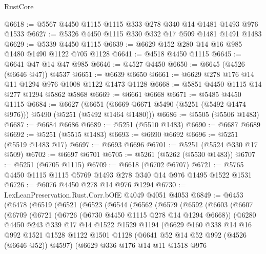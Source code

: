 \begin{lexlean}{RustCore}
\begin{coremodule}
@6618 := @5567 @4450 @1115 @1115 @333 @278 @340 @14 @1481 @1493 @976 @1533
@6627 := @5326 @4450 @1115 @330 @332 @17 @509 @1481 @1491 @1483
@6629 := @5339 @4450 @1115
@6639 := @6629 @152 @280 @14 @16 @985 @1480 @1490 @1122 @705 @1128
@6641 := @4518 @4450 @1115
@6645 := @6641 @47 @14 @47 @985
@6646 := @4527 @4450
@6650 := @6645 (@4526 (@6646 @47)) @4537
@6651 := @6639 @6650
@6661 := @6629 @278 @176 @14 @11 @1294 @976 @1008 @1122 @1473 @1128
@6668 := @5851 @4450 @1115 @14 @277 @1294 @5862 @5868
@6669 := @6661 @6668
@6671 := @5485 @4450 @1115
@6684 := @6627
    (@6651 (@6669 @6671 @5490 (@5251 (@5492 @1474 @976))) @5490 (@5251 (@5492 @1464 @1480)))
@6686 := @5505 (@5506 @1483)
@6687 := @6684 @6686
@6689 := @5251 (@5510 @1483)
@6690 := @6687 @6689
@6692 := @5251 (@5515 @1483)
@6693 := @6690 @6692
@6696 := @5251 (@5519 @1483 @17)
@6697 := @6693 @6696
@6701 := @5251 (@5524 @330 @17 @509)
@6702 := @6697 @6701
@6705 := @5261 (@5262 (@5530 @1483))
@6707 := @5251 (@6705 @1115)
@6709 := @6618 (@6702 @6707)
@6721 := @5765 @4450 @1115 @1115 @5769 @1493 @278 @340 @14 @976 @1495 @1522 @1531
@6726 := @6076 @4450 @278 @14 @976 @1294
@6730 := LexLeanPreservation.Rust.Corr.bOfE @4049 @4051 @4053
@6849 := @6453
    (@6478
      (@6519
        (@6521
          (@6523
            (@6544
              (@6562
                (@6579
                  (@6592
                    (@6603
                      (@6607
                        (@6709
                          (@6721
                            (@6726 (@6730 @4450 @1115 @278 @14 @1294 @6668))
                            (@6280
                              @4450
                              @243
                              @339
                              @17
                              @14
                              @1522
                              @1529
                              @1194
                              (@6629
                                @160
                                @338
                                @14
                                @16
                                @992
                                @1521
                                @1528
                                @1122
                                @1501
                                @1128
                                (@6641 @52 @14 @52 @992 (@4526 (@6646 @52)) @4597)
                                (@6629
                                  @336
                                  @176
                                  @14
                                  @11
                                  @1518
                                  @976

\end{coremodule}
\end{lexlean}
